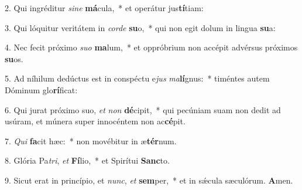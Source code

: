 2. Qui ingréditur \textit{si}\textit{ne} \textbf{má}cula,~*  et operátur jus\textbf{tí}tiam:\

3. Qui lóquitur veritátem in \textit{cor}\textit{de} \textbf{su}o,~*  qui non egit dolum in lingua \textbf{su}a:\

4. Nec fecit próximo \textit{su}\textit{o} \textbf{ma}lum,~*  et oppróbrium non accépit advérsus próximos \textbf{su}os.\

5. Ad níhilum dedúctus est in conspéctu e\textit{jus} \textit{ma}\textbf{lí}gnus:~*  timéntes autem Dóminum glo\textbf{rí}ficat:\

6. Qui jurat próximo suo, \textit{et} \textit{non} \textbf{dé}cipit,~*  qui pecúniam suam non dedit ad usúram, et múnera super innocéntem non ac\textbf{cé}pit.\

7. \textit{Qui} \textbf{fa}cit hæc:~*  non movébitur in æ\textbf{tér}num.\

8. Glória Pa\textit{tri}, \textit{et} \textbf{Fí}lio,~*  et Spirítui \textbf{Sanc}to.\

9. Sicut erat in princípio, et \textit{nunc}, \textit{et} \textbf{sem}per,~*  et in sǽcula sæculórum. \textbf{A}men.\

